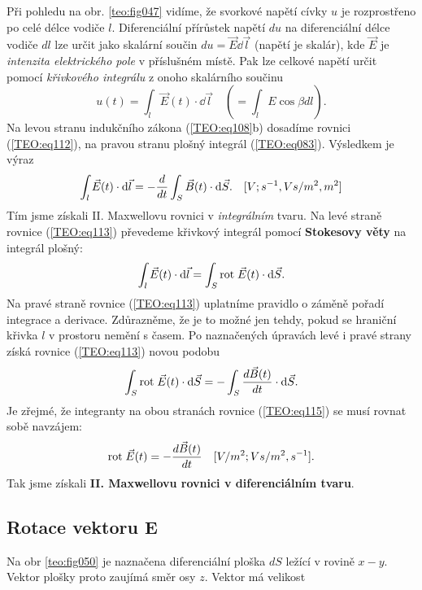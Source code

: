       Při pohledu na obr. \ref{teo:fig047} vidíme, že svorkové napětí cívky \(u\) je rozprostřeno po
      celé délce vodiče \(l\). Diferenciální přírůstek napětí \(du\) na diferenciální délce vodiče
      \(dl\) lze určit jako skalární součin \(du = \vec{E}\dd{\vec{l}}\) (napětí je skalár), kde
      \(\vec{E}\) je \emph{intenzita elektrického pole} v příslušném místě. Pak lze celkové napětí
      určit pomocí \emph{křivkového integrálu} z onoho skalárního součinu
      \begin{equation}\label{TEO:eq112}
        u(t) = \int_{l}\vec{E}(t)\cdot \dd{\vec{l}} \quad (=\int_lE\cos\beta dl).
      \end{equation}
      Na levou stranu indukčního zákona (\ref{TEO:eq108}b) dosadíme rovnici
      (\ref{TEO:eq112}), na pravou stranu plošný integrál (\ref{TEO:eq083}). Výsledkem
      je výraz
      \begin{equation}\label{TEO:eq113}
        \int_{l}\vec{E}(t)\cdot \mathop{}\!\mathrm{d}\vec{l} = -\dfrac{d }{d t}\int_{S}\vec{B}(t)\cdot \mathop{}\!\mathrm{d}\vec{S}.
        \quad [V;s^{-1},Vs/m^2,m^2]
      \end{equation}
      Tím jsme získali II. Maxwellovu rovnici v \emph{integrálním} tvaru. Na levé straně rovnice
      (\ref{TEO:eq113}) převedeme křivkový integrál pomocí \textbf{Stokesovy věty} na
      integrál plošný:
      \begin{equation*}
        \int_{l}\vec{E}(t)\cdot \mathop{}\!\mathrm{d}\vec{l} = \int_{S}\mathrm{rot}\;\vec{E}(t)\cdot \mathop{}\!\mathrm{d}\vec{S}.
      \end{equation*}
      Na pravé straně rovnice (\ref{TEO:eq113}) uplatníme pravidlo o záměně pořadí integrace
      a derivace. Zdůrazněme, že je to možné jen tehdy, pokud se hraniční křivka \(l\) v prostoru
      nemění s časem. Po naznačených úpravách levé i pravé strany získá rovnice
      (\ref{TEO:eq113}) novou podobu
      \begin{equation}\label{TEO:eq115}
        \int_{S}\mathrm{rot}\;\vec{E}(t)\cdot \mathop{}\!\mathrm{d}\vec{S} = -\int_{S}\dfrac{d \vec{B}(t)}{d t}\cdot \mathop{}\!\mathrm{d}\vec{S}.
      \end{equation}
      Je zřejmé, že integranty na obou stranách rovnice (\ref{TEO:eq115}) se musí rovnat sobě
      navzájem:
      \begin{equation*}
        \mathrm{rot}\;\vec{E}(t) = -\dfrac{d \vec{B}(t)}{d t} \quad [V/m^2;Vs/m^2,s^{-1}].
      \end{equation*}
      Tak jsme získali \textbf{II. Maxwellovu rovnici v diferenciálním tvaru}.
      
      \subsection{Rotace vektoru E}\label{ES:sec05}
        Na obr \ref{teo:fig050} je naznačena diferenciální ploška \(dS\) ležící v rovině \(x-y\).
        Vektor plošky proto zaujímá směr osy \(z\). Vektor má velikost
        
